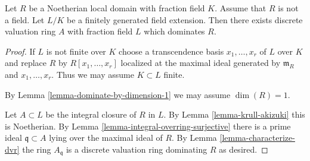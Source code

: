 \begin{lemma}
\label{lemma-exists-dvr}
Let $R$ be a Noetherian local domain with fraction field $K$.
Assume that $R$ is not a field.
Let $L/K$ be a finitely generated field extension.
Then there exists discrete valuation ring $A$ with fraction field
$L$ which dominates $R$.
\end{lemma}

\begin{proof}
If $L$ is not finite over $K$ choose a transcendence basis
$x_1, \ldots, x_r$ of $L$ over $K$ and replace $R$ by
$R[x_1, \ldots, x_r]$ localized at the maximal ideal
generated by $\mathfrak m_R$ and $x_1, \ldots, x_r$.
Thus we may assume $K \subset L$ finite.

\medskip\noindent
By Lemma \ref{lemma-dominate-by-dimension-1} we may assume $\dim(R) = 1$.

\medskip\noindent
Let $A \subset L$ be the integral closure of $R$ in $L$.
By Lemma \ref{lemma-krull-akizuki} this is Noetherian.
By Lemma \ref{lemma-integral-overring-surjective} there
is a prime ideal $\mathfrak q \subset A$ lying
over the maximal ideal of $R$.
By Lemma \ref{lemma-characterize-dvr} the ring $A_{\mathfrak q}$ is a discrete
valuation ring dominating $R$ as desired.
\end{proof}
